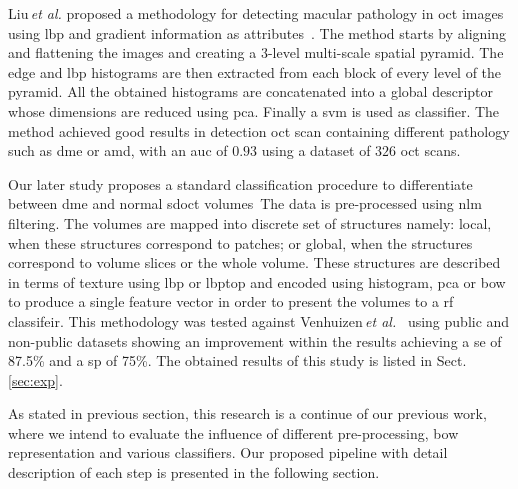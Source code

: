 Liu\,\textit{et al.} proposed a methodology for detecting macular pathology in \ac{oct} images using \ac{lbp} and gradient information as attributes~\cite{Liu2011}.
The method starts by aligning and flattening the images and creating a $3$-level multi-scale spatial pyramid.
The edge and \ac{lbp} histograms are then extracted from each block of every level of the pyramid.
All the obtained histograms are concatenated into a global descriptor whose dimensions are reduced using \ac{pca}.
Finally a \ac{svm} is used as classifier.
The method achieved good results in detection \ac{oct} scan containing different pathology such as \ac{dme} or \ac{amd}, with an \ac{auc} of $0.93$ using a dataset of $326$ \ac{oct} scans.

Our later study proposes a standard classification procedure to differentiate between \ac{dme} and normal \ac{sdoct} volumes~\cite{Lemaitre2015}The data is pre-processed using \ac{nlm} filtering.
The volumes are mapped into discrete set of structures namely: local, when these structures correspond to patches; or global, when the structures correspond to volume slices or the whole volume.
These structures are described in terms of texture using \ac{lbp} or \ac{lbptop} and encoded using histogram, \ac{pca} or \ac{bow} to produce a single feature vector in order to present the volumes to a \ac{rf} classifeir.
This methodology was tested against Venhuizen\,\textit{et al.}~\cite{Venhuizen2015} using public and non-public datasets showing an improvement within the results achieving a \ac{se} of 87.5\% and a \ac{sp} of 75\%.
The obtained results of this study is listed in Sect.\,\ref{sec:exp}.

As stated in previous section, this research is a continue of our previous work, where we intend to evaluate the influence of different pre-processing, \ac{bow} representation and various classifiers.
Our proposed pipeline with detail description of each step is presented in the following section.
 

%  




